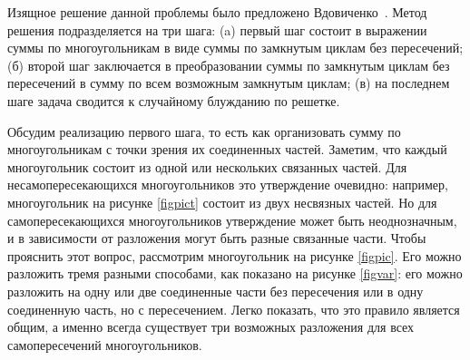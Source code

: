 Изящное решение данной проблемы было предложено Вдовиченко~\cite{vdovichenko1965}. Метод решения подразделяется на три шага: (a) первый шаг состоит в выражении суммы по многоугольникам в виде суммы по замкнутым циклам без пересечений; (б) второй шаг заключается в преобразовании суммы по замкнутым циклам без пересечений в сумму по всем возможным замкнутым циклам; (в) на последнем шаге задача сводится к случайному блужданию по решетке.



Обсудим реализацию первого шага, то есть как организовать сумму по многоугольникам с точки зрения их соединенных частей. Заметим, что каждый многоугольник состоит из одной или нескольких связанных частей. Для несамопересекающихся многоугольников это утверждение очевидно: например, многоугольник на рисунке \ref{figpict} состоит из двух несвязных частей. Но для самопересекающихся многоугольников утверждение может быть неоднозначным, и в зависимости от разложения могут быть разные связанные части. Чтобы прояснить этот вопрос, рассмотрим многоугольник на рисунке \ref{figpic}. Его можно разложить тремя разными способами, как показано на рисунке \ref{figvar}: его можно разложить на одну или две соединенные части без пересечения или в одну соединенную часть, но с пересечением. Легко показать, что это правило является общим, а именно всегда существует три возможных разложения для всех самопересечений многоугольников. 



